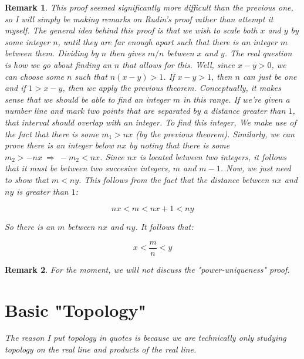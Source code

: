 \documentclass[10pt, oneside]{article}
\newtheorem{rem}{Remark}
\begin{document}
\begin{rem}
  This proof seemed significantly more difficult than the previous one, so I will simply be making remarks on Rudin's proof rather than attempt it myself.
  The general idea behind this proof is that we wish to scale both $x$ and $y$ by some integer $n$, until they are far enough apart such that there is an integer $m$ between
  them. Dividing by $n$ then gives $m/n$ between $x$ and $y$.
  \newline\newline
  The real question is how we go about finding an $n$ that allows for this. Well, since $x  - y > 0$, we can choose some $n$ such that
  $n(x - y) > 1$. If $x - y > 1$, then $n$ can just be one and if $1 > x - y$, then we apply the previous theorem. Conceptually, it makes
  sense that we should be able to find an integer $m$ in this range. If we're given a number line and mark two points that are separated by a distance greater than $1$,
  that interval should overlap with an integer.
  \newline\newline
  To find this integer, We make use of the fact that there is some $m_1 > nx$ (by the previous theorem). Similarly, we can prove there is an integer below $nx$ by noting that
  there is some $m_2 > -nx \ \Rightarrow \ -m_2 < nx$. Since $nx$ is located between two integers, it follows that it must be between two succesive integers, $m$ and $m - 1$.
  \newline\newline
  Now, we just need to show that $m < ny$. This follows from the fact that the distance between $nx$ and $ny$ is greater than $1$:

  $$nx < m < nx + 1 < ny$$

  So there is an $m$ between $nx$ and $ny$. It follows that:

  $$x < \frac{m}{n} < y$$
\end{rem}

\begin{rem}
	For the moment, we will not discuss the "power-uniqueness" proof.
\end{rem}

\section{Basic "Topology"}

\textit{The reason I put topology in quotes is because we are technically only studying topology on the real line and 
products of the real line.}
\end{document}
